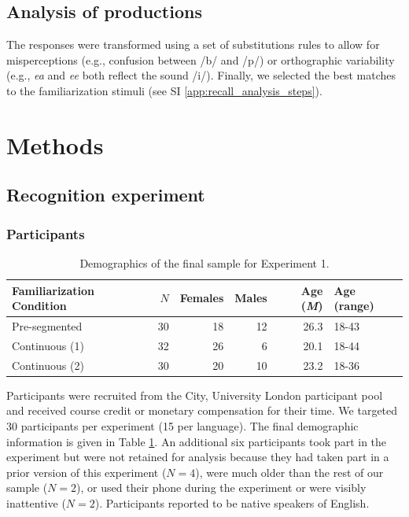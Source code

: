 \documentclass[]{article}
\newcommand{\M}{{\em M\/}}
\newcommand{\myappendix}{%
  \clearpage
   \setcounter{section}{0}
  \renewcommand{\thesection}{SOM\arabic{section}}
  \renewcommand{\thesubsection}{\thesection.\arabic{subsection}}

  \setcounter{figure}{0}
  \setcounter{table}{0} %
  \renewcommand{\thefigure}{S\arabic{figure}}
  \renewcommand{\thetable}{S\arabic{table}}

  \clearpage
  {\noindent {\LARGE {\bf Supplementary Online Materials}}}
}
\newcommand{\appsectionFirst}[1]{
  \section{#1}
  \setcounter{subsection}{0}%
}
\begin{document}
\subsection{Analysis of productions}\label{analysis-of-productions}

The responses were transformed using a set of substitutions rules to allow for misperceptions (e.g., confusion between /b/ and /p/) or orthographic variability (e.g., \emph{ea} and \emph{ee} both reflect the sound /i/). Finally, we selected the best matches to the familiarization stimuli (see SI \ref{app:recall_analysis_steps}).

\clearpage



\clearpage


\myappendix

\appsectionFirst{Methods}\label{app:methods}

\subsection{Recognition experiment}\label{recognition-experiment-london}

\subsubsection{Participants}\label{participants-1}

\begin{table}[hbp]

\caption{\label{tab:stats-london-demographics-print}Demographics of the final sample for Experiment 1.}
\centering
\begin{tabular}[t]{lrrrrl}
\toprule
Familiarization Condition & $N$ & Females & Males & Age (\M) & Age (range)\\
\midrule
Pre-segmented & 30 & 18 & 12 & 26.3 & 18-43\\
Continuous (1) & 32 & 26 & 6 & 20.1 & 18-44\\
Continuous (2) & 30 & 20 & 10 & 23.2 & 18-36\\
\bottomrule
\end{tabular}
\end{table}

Participants were recruited from the City, University London participant pool and received course credit or monetary compensation for their time. We targeted 30 participants per experiment (15 per language). The final demographic information is given in Table \ref{tab:stats-london-demographics-print}. An additional six participants took part in the experiment but were not retained for analysis because they had taken part in a prior version of this experiment (\(N = 4\)), were much older than the rest of our sample (\(N = 2\)), or used their phone during the experiment or were visibly inattentive (\(N = 2\)). Participants reported to be native speakers of English.
\end{document}
